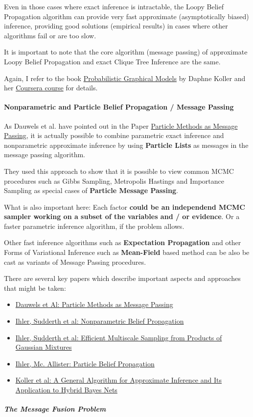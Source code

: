 \documentclass[letterpaper,10pt,english]{/home/londenberg/python-env/clean/lib/python2.7/site-packages/sphinx/texinputs/sphinxhowto}
\begin{document}
Even in those cases where exact inference is intractable, the Loopy
Belief Propagation algorithm can provide very fast approximate
(asymptotically biased) inference, providing good solutions (empirical
results) in cases where other algorithms fail or are too slow.

It is important to note that the core algorithm (message passing) of
approximate Loopy Belief Propagation and exact Clique Tree Inference are
the same.

Again, I refer to the book
\href{http://mitpress.mit.edu/books/probabilistic-graphical-models}{Probabilistic
Graphical Models} by Daphne Koller and her
\href{https://www.coursera.org/course/pgm}{Coursera course} for details.\paragraph{Nonparametric and Particle Belief Propagation / Message
Passing}

As Dauwels et al. have pointed out in the Paper
\href{http://www.dauwels.com/Papers/Particle.pdf}{Particle Methods as
Message Passing}, it is actually possible to combine parametric exact
inference and nonparametric approximate inference by using
\textbf{Particle Lists} as messages in the message passing algorithm.

They used this approach to show that it is possible to view common MCMC
procedures such as Gibbs Sampling, Metropolis Hastings and Importance
Sampling as special cases of \textbf{Particle Message Passing}.

What is also important here: Each factor \textbf{could be an independend
MCMC sampler working on a subset of the variables and / or evidence}. Or
a faster parametric inference algorithm, if the problem allows.

Other fast inference algorithms such as \textbf{Expectation Propagation}
and other Forms of Variational Inference such as \textbf{Mean-Field}
based method can be also be cast as variants of Message Passing
procedures.

There are several key papers which describe important aspects and
approaches that might be taken:

\begin{itemize}
\item
  \href{http://www.dauwels.com/Papers/Particle.pdf}{Dauwels et Al:
  Particle Methods as Message Passing}
\item
  \href{http://ssg.mit.edu/nbp/papers/nips03.pdf}{Ihler, Sudderth et al:
  Nonparametric Belief Propagation}
\item
  \href{http://ssg.mit.edu/nbp/papers/nips03.pdf}{Ihler, Sudderth et al:
  Efficient Multiscale Sampling from Products of Gaussian Mixtures}
\item
  \href{http://machinelearning.wustl.edu/mlpapers/paper\_files/AISTATS09\_IhlerM.pdf}{Ihler,
  Mc. Allister: Particle Belief Propagation}
\item
  \href{http://robotics.stanford.edu/~koller/Papers/Koller+al:UAI99.pdf}{Koller
  et al: A General Algorithm for Approximate Inference and Its
  Application to Hybrid Bayes Nets}
\end{itemize}\subparagraph{The Message Fusion Problem}
\end{document}
